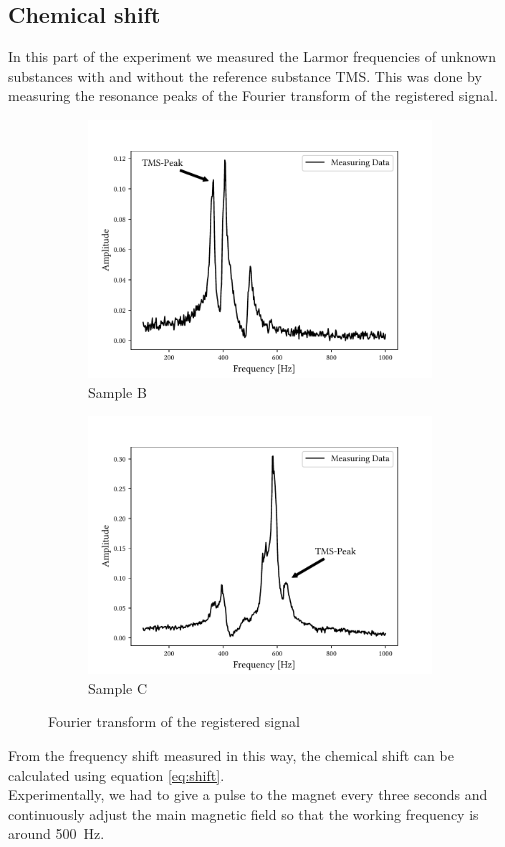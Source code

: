 \subsection{Chemical shift}
In this part of the experiment we measured the Larmor frequencies of unknown substances with and without the reference substance TMS.
This was done by measuring the resonance peaks of the Fourier transform of the registered signal.
\begin{figure}[ht]
\begin{subfigure}{.45\textwidth}
\includegraphics[width=9.3cm]{..//figures//f61_abb_4.pdf}
\caption{Sample B}
\end{subfigure}
\qquad
\begin{subfigure}{.45\textwidth}
\includegraphics[width=9.3cm]{..//figures//f61_abb_5.pdf}
\caption{Sample C}
\end{subfigure}
\caption{Fourier transform of the registered signal}
\label{fig:fourier}
\end{figure}
From the frequency shift measured in this way, the chemical shift can be calculated using equation \ref{eq:shift}.\\
Experimentally, we had to give a pulse to the magnet every three seconds and continuously adjust the main magnetic field so that the working frequency is around \SI{500}{\hertz}.
